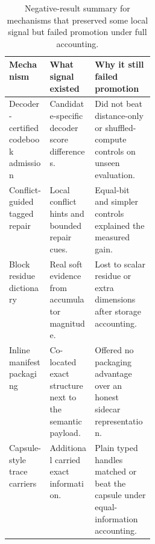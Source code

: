 \begin{table}[htbp]
\centering
\footnotesize
\begin{threeparttable}
\caption{Negative-result summary for mechanisms that preserved some local signal but failed promotion under full accounting.}
\label{tab:negative-results}
\begin{tabularx}{\linewidth}{@{}p{0.28\linewidth}X X@{}}
\toprule
\textbf{Mechanism} & \textbf{What signal existed} & \textbf{Why it still failed promotion} \\
\midrule
Decoder-certified codebook admission & Candidate-specific decoder score differences. & Did not beat distance-only or shuffled-compute controls on unseen evaluation. \\
Conflict-guided tagged repair & Local conflict hints and bounded repair cues. & Equal-bit and simpler controls explained the measured gain. \\
Block residue dictionary & Real soft evidence from accumulator magnitude. & Lost to scalar residue or extra dimensions after storage accounting. \\
Inline manifest packaging & Co-located exact structure next to the semantic payload. & Offered no packaging advantage over an honest sidecar representation. \\
Capsule-style trace carriers & Additional carried exact information. & Plain typed handles matched or beat the capsule under equal-information accounting. \\
\bottomrule
\end{tabularx}
\end{threeparttable}
\end{table}

